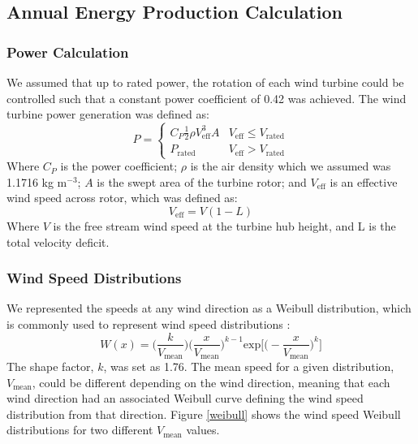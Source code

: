\documentclass[WESD, manuscript]{copernicus}
\begin{document}
	\subsection{Annual Energy Production Calculation}
	\subsubsection{Power Calculation}
We assumed that up to rated power, the rotation of each wind turbine could be controlled such that a constant power coefficient of 0.42 was achieved. The wind turbine power generation was defined as:
\begin{equation}
P = 
\begin{cases} 
      C_P\frac{1}{2}\rho V_{\text{eff}}^3A & V_{\text{eff}}\leq V_{\text{rated}} \\
      P_{\text{rated}} & V_{\text{eff}} > V_{\text{rated}}
   \end{cases}
\end{equation}
\noindent Where $C_P$ is the power coefficient; $\rho$ is the air density which we assumed was 1.1716 kg m$^{-3}$; $A$ is the swept area of the turbine rotor; and $V_{\text{eff}}$ is an effective wind speed across rotor, which was defined as:
\begin{equation}
V_{\text{eff}} = V(1-L)
\end{equation}
\noindent Where $V$ is the free stream wind speed at the turbine hub height, and L is the total velocity deficit.


\subsubsection{Wind Speed Distributions}

We represented the speeds at any wind direction as a Weibull distribution, which is commonly used to represent wind speed distributions \citep{justus1978methods,rehman1994weibull,dorvlo2002estimating}: 
\begin{equation}
W(x) = \Big(\frac{k}{V_{\text{mean}}}\Big)\Big(\frac{x}{V_{\text{mean}}}\Big)^{k-1}\text{exp}\Big[\Big(-\frac{x}{V_{\text{mean}}}\Big)^k\Big]
\end{equation}
The shape factor, $k$, was set as 1.76. 
The mean speed for a given distribution, $V_{\text{mean}}$, could be different depending on the wind direction, meaning that each wind direction had an associated Weibull curve defining the wind speed distribution from that direction. 
Figure \ref{weibull} shows the wind speed Weibull distributions for two different $V_{\text{mean}}$ values. 
\end{document}
